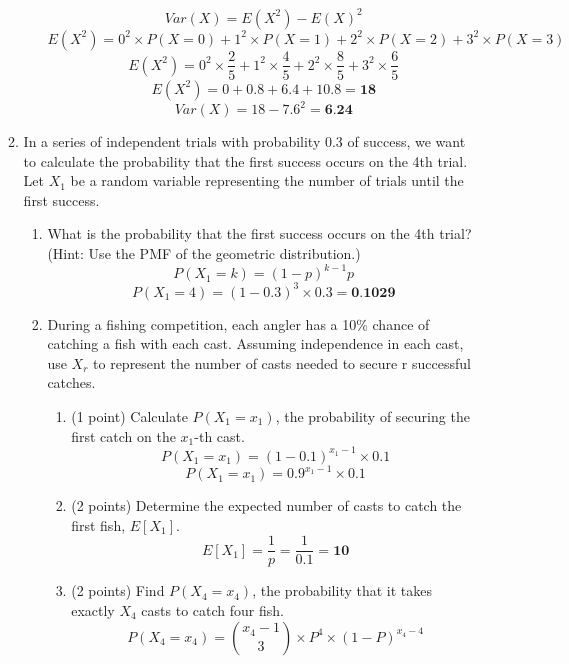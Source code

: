 \documentclass[a3paper,12pt]{article} %
\begin{document}
\begin{enumerate}
\begin{enumerate}
\begin{enumerate}
            \[
                Var(X) = E(X^2) - E(X)^2
            \]
            \[
                E(X^2) = 0^2 \times P(X = 0) + 1^2 \times P(X = 1) + 2^2 \times P(X = 2) + 3^2 \times P(X = 3)
            \]
            \[
                E(X^2) = 0^2 \times \frac{2}{5} + 1^2 \times \frac{4}{5} + 2^2 \times \frac{8}{5} + 3^2 \times \frac{6}{5}
            \]
            \[
                E(X^2) = 0 + 0.8 + 6.4 + 10.8 = \textbf{18}
            \]
            \[
                Var(X) = 18 - 7.6^2 = \textbf{6.24}
            \]
        \end{enumerate}
        \item In a series of independent trials with probability 0.3 of success, we want to calculate the probability that the first success occurs on the 4th trial. Let \(X_1\) be a random variable representing the number of trials until the first success.
        \begin{enumerate}
            \item What is the probability that the first success occurs on the 4th trial? (Hint: Use the PMF of the geometric distribution.)
            \[
            P(X_1 = k) = (1 - p)^{k-1} p
            \]
            \[
                P(X_1 = 4) = (1 - 0.3)^3 \times 0.3 = \textbf{0.1029}
            \]
            \item During a fishing competition, each angler has a 10\% chance of catching a fish with each cast.
            Assuming independence in each cast, use \(X_r\) to represent the number of casts needed to secure
            r successful catches.
            \begin{enumerate}
                \item (1 point) Calculate \(P(X_1 = x_1)\), the probability of securing the first catch on the \(x_1\)-th cast.
                \[
                    P(X_1 = x_1) = (1 - 0.1)^{x_1 - 1} \times 0.1
                \]
                \[
                    P(X_1 = x_1) = 0.9^{x_1 - 1} \times 0.1
                \]
                \item (2 points) Determine the expected number of casts to catch the first fish, \(E[X_1]\).
                \[
                    E[X_1] = \frac{1}{p} = \frac{1}{0.1} = \textbf{10}
                \]
                \item (2 points) Find \(P(X_4 = x_4)\), the probability that it takes exactly \(X_4\) casts to catch four fish.
                \[
                    P(X_4 = x_4) = \binom{x_4 - 1}{3} \times P^4 \times (1 - P)^{x_4 - 4}
                \]

\end{enumerate}
\end{enumerate}
\end{enumerate}
\end{enumerate}
\end{document}
